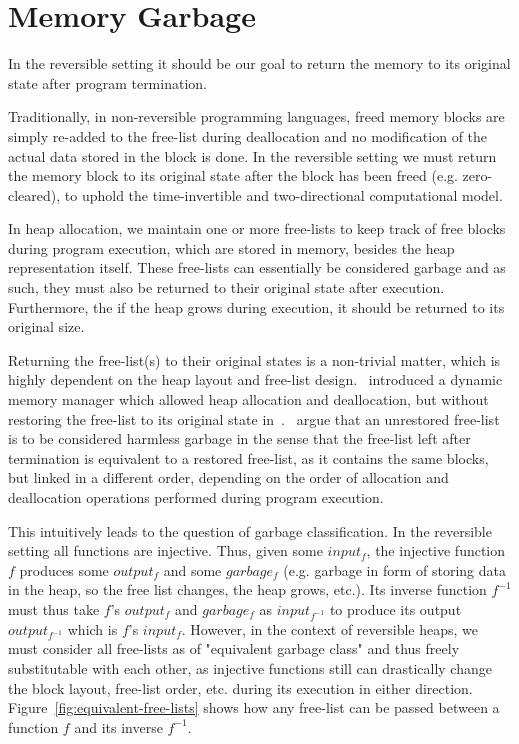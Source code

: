 \section{Memory Garbage}
\label{sec:memory-garbage}
In the reversible setting it should be our goal to return the memory to its original state after program termination.

Traditionally, in non-reversible programming languages, freed memory blocks are simply re-added to the free-list during deallocation and no modification of the actual data stored in the block is done. In the reversible setting we must return the memory block to its original state after the block has been freed (e.g. zero-cleared), to uphold the time-invertible and two-directional computational model. 

In heap allocation, we maintain one or more free-lists to keep track of free blocks during program execution, which are stored in memory, besides the heap representation itself. These free-lists can essentially be considered garbage and as such, they must also be returned to their original state after execution. Furthermore, the if the heap grows during execution, it should be returned to its original size.

Returning the free-list(s) to their original states is a non-trivial matter, which is highly dependent on the heap layout and free-list design.~\citeauthor{ha:heap} introduced a dynamic memory manager which allowed heap allocation and deallocation, but without restoring the free-list to its original state in~\cite{ha:heap}.~\citeauthor{ha:heap} argue that an unrestored free-list is to be considered harmless garbage in the sense that the free-list left after termination is equivalent to a restored free-list, as it contains the same blocks, but linked in a different order, depending on the order of allocation and deallocation operations performed during program execution.

This intuitively leads to the question of garbage classification. In the reversible setting all functions are injective. Thus, given some $input_f$, the injective function $f$ produces some $output_f$ and some $garbage_f$ (e.g. garbage in form of storing data in the heap, so the free list changes, the heap grows, etc.). Its inverse function $f^{-1}$ must thus take $f$'s $output_f$ and $garbage_f$ as $input_{f^{-1}}$ to produce its output $output_{f^{-1}}$ which is $f$'s $input_f$. However, in the context of reversible heaps, we must consider all free-lists as of "equivalent garbage class" and thus freely substitutable with each other, as injective functions still can drastically change the block layout, free-list order, etc. during its execution in either direction. Figure~\ref{fig:equivalent-free-lists} shows how any free-list can be passed between a function $f$ and its inverse $f^{-1}$.

